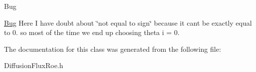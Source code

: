 \begin{DoxyRefDesc}{Bug}
\item[\hyperlink{bug__bug000003}{Bug}]Here I have doubt about \char`\"{}not equal to sign\char`\"{} because it can\textquotesingle{}t be exactly equal to 0. so most of the time we end up choosing theta i = 0. \end{DoxyRefDesc}


The documentation for this class was generated from the following file\+:\begin{DoxyCompactItemize}
\item 
Diffusion\+Flux\+Roe.\+h\end{DoxyCompactItemize}
